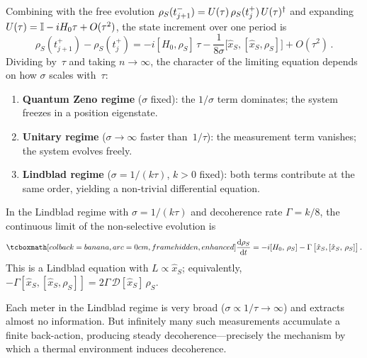 \noindent Combining with the free evolution
$\rho_S(t_{j+1}^-) = U(\tau)\,\rho_S(t_j^+)\,U(\tau)^\dagger$ and
expanding $U(\tau) = \mathbb{I} - iH_0\tau + O(\tau^2)$, the state
increment over one period is
\begin{equation}\label{eq:state-increment}
  \rho_S(t_{j+1}^+) - \rho_S(t_j^+)
  = -i[H_0, \rho_S]\,\tau
    - \frac{1}{8\sigma}\bigl[\hat{x}_S,
      [\hat{x}_S, \rho_S]\bigr]
    + O(\tau^2)\,.
\end{equation}
Dividing by~$\tau$ and taking $n \to \infty$, the character of the
limiting equation depends on how $\sigma$ scales with~$\tau$:
\begin{enumerate}
  \item \textbf{Quantum Zeno regime} ($\sigma$ fixed):
    the $1/\sigma$ term dominates; the system freezes in a position
    eigenstate.
  \item \textbf{Unitary regime}
    ($\sigma \to \infty$ faster than~$1/\tau$):
    the measurement term vanishes; the system evolves freely.
  \item \textbf{Lindblad regime}
    ($\sigma = 1/(k\tau)$, $k > 0$ fixed):
    both terms contribute at the same order, yielding a non-trivial
    differential equation.
\end{enumerate}

\begin{keyresult}
  In the Lindblad regime with $\sigma = 1/(k\tau)$ and decoherence
  rate $\Gamma = k/8$, the continuous limit of the non-selective
  evolution is
  \begin{equation}\label{eq:cm-lindblad}
    \eqbox{\frac{\dd\rho_S}{\dd t}
    = -i[H_0,\,\rho_S]
      - \Gamma\,\bigl[\hat{x}_S,
        [\hat{x}_S,\,\rho_S]\bigr]}\,.
  \end{equation}
  This is a Lindblad equation with $L \propto \hat{x}_S$;
  equivalently,
  $-\Gamma[\hat{x}_S,[\hat{x}_S,\rho_S]]
  = 2\Gamma\,\mathcal{D}[\hat{x}_S]\,\rho_S$.
\end{keyresult}

\begin{intuition}
  Each meter in the Lindblad regime is very broad
  ($\sigma \propto 1/\tau \to \infty$) and extracts almost no
  information.  But infinitely many such measurements accumulate a
  finite back-action, producing steady decoherence---precisely the
  mechanism by which a thermal environment induces decoherence.
\end{intuition}

